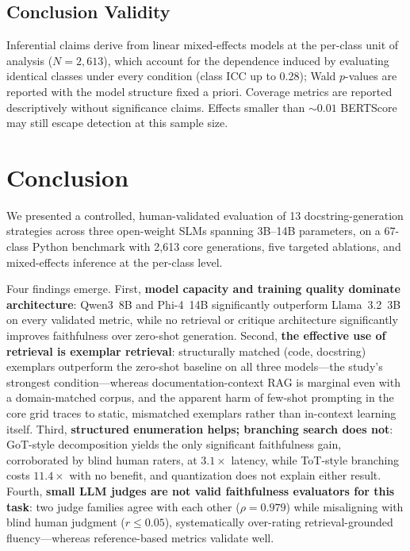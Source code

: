 \documentclass[pdflatex,sn-mathphys-ay]{sn-jnl}%
\theoremstyle{thmstyleone}%
\theoremstyle{thmstyletwo}%
\theoremstyle{thmstylethree}%
\begin{document}
\subsection{Conclusion Validity}
Inferential claims derive from linear mixed-effects models at the per-class unit of analysis ($N=2{,}613$), which account for the dependence induced by evaluating identical classes under every condition (class ICC up to 0.28); Wald $p$-values are reported with the model structure fixed a priori. Coverage metrics are reported descriptively without significance claims. Effects smaller than ${\sim}0.01$ BERTScore may still escape detection at this sample size.

\section{Conclusion}
\label{sec:conclusion}
We presented a controlled, human-validated evaluation of 13 docstring-generation strategies across three open-weight SLMs spanning 3B--14B parameters, on a 67-class Python benchmark with 2,613 core generations, five targeted ablations, and mixed-effects inference at the per-class level.

Four findings emerge. First, \textbf{model capacity and training quality dominate architecture}: Qwen3~8B and Phi-4~14B significantly outperform Llama~3.2~3B on every validated metric, while no retrieval or critique architecture significantly improves faithfulness over zero-shot generation. Second, \textbf{the effective use of retrieval is exemplar retrieval}: structurally matched (code, docstring) exemplars outperform the zero-shot baseline on all three models---the study's strongest condition---whereas documentation-context RAG is marginal even with a domain-matched corpus, and the apparent harm of few-shot prompting in the core grid traces to static, mismatched exemplars rather than in-context learning itself. Third, \textbf{structured enumeration helps; branching search does not}: GoT-style decomposition yields the only significant faithfulness gain, corroborated by blind human raters, at $3.1\times$ latency, while ToT-style branching costs $11.4\times$ with no benefit, and quantization does not explain either result. Fourth, \textbf{small LLM judges are not valid faithfulness evaluators for this task}: two judge families agree with each other ($\rho=0.979$) while misaligning with blind human judgment ($r\le0.05$), systematically over-rating retrieval-grounded fluency---whereas reference-based metrics validate well.
\end{document}
